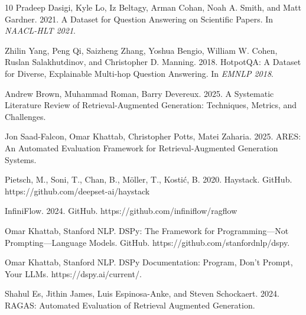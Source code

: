 \documentclass[11pt]{article}
\begin{document}
\begin{thebibliography}{10}
Pradeep Dasigi, Kyle Lo, Iz Beltagy, Arman Cohan, Noah A. Smith, and Matt Gardner. 2021.
A Dataset for Question Answering on Scientific Papers. In \emph{NAACL-HLT 2021}.

Zhilin Yang, Peng Qi, Saizheng Zhang, Yoshua Bengio, William W. Cohen, Ruslan Salakhutdinov, and Christopher D. Manning. 2018.
HotpotQA: A Dataset for Diverse, Explainable Multi-hop Question Answering. In \emph{EMNLP 2018}.

Andrew Brown, Muhammad Roman, Barry Devereux. 2025.
A Systematic Literature Review of Retrieval-Augmented Generation: Techniques, Metrics, and Challenges. 

Jon Saad-Falcon, Omar Khattab, Christopher Potts, Matei Zaharia. 2025.
ARES: An Automated Evaluation Framework for Retrieval-Augmented Generation Systems.

Pietsch, M., Soni, T., Chan, B., Möller, T., Kostić, B. 2020. 
Haystack. GitHub. https://github.com/deepset-ai/haystack

InfiniFlow. 2024. GitHub. https://github.com/infiniflow/ragflow 

Omar Khattab, Stanford NLP.
DSPy: The Framework for Programming—Not Prompting—Language Models.
GitHub. https://github.com/stanfordnlp/dspy.

Omar Khattab, Stanford NLP.
DSPy Documentation: Program, Don't Prompt, Your LLMs.
https://dspy.ai/current/.

Shahul Es, Jithin James, Luis Espinosa-Anke, and Steven Schockaert. 2024.
RAGAS: Automated Evaluation of Retrieval Augmented Generation. 


\end{thebibliography}


%
%
\end{document}
